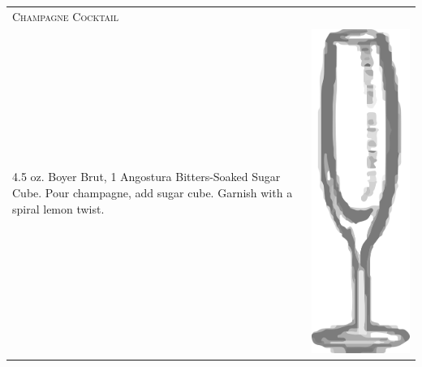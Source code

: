 \documentclass{article}
\begin{document}
\begin{tabular}{p{2in} p{0.5in}}
\multicolumn{2}{p{3in}}{\centering\Huge\textsc{Champagne Cocktail}} \\ 
  \vspace{-0.1in}4.5 oz. Boyer Brut, 1 Angostura Bitters-Soaked Sugar Cube. Pour champagne, add sugar cube.  Garnish with a spiral lemon twist. &
  \vspace{-0.1in} \includegraphics{flute.png}
\end{tabular}
\end{document}
